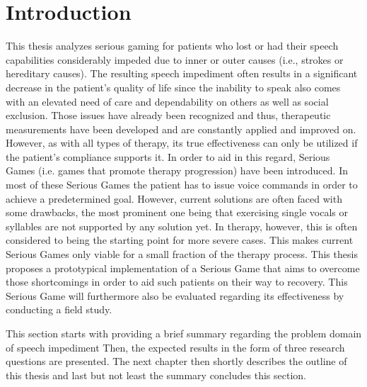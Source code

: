 \documentclass[draft,final]{vutinfth} %
\begin{document}

\setcounter{secnumdepth}{3}
\setcounter{tocdepth}{3}
\tableofcontents %

\mainmatter

\chapter{Introduction}
\label{chap:intro}
This thesis analyzes serious gaming for patients who lost or had their speech capabilities considerably impeded due to inner or outer causes (i.e., strokes or hereditary causes). The resulting speech impediment often results in a significant decrease in the patient's quality of life since the inability to speak also comes with an elevated need of care and dependability on others as well as social exclusion. Those issues have already been recognized and thus, therapeutic measurements have been developed and are constantly applied and improved on. However, as with all types of therapy, its true effectiveness can only be utilized if the patient's compliance supports it. In order to aid in this regard, Serious Games (i.e. games that promote therapy progression) have been introduced. In most of these Serious Games the patient has to issue voice commands in order to achieve a predetermined goal. However, current solutions are often faced with some drawbacks, the most prominent one being that exercising single vocals or syllables are not supported by any solution yet. In therapy, however, this is often considered to being the starting point for more severe cases. This makes current Serious Games only viable for a small fraction of the therapy process. This thesis proposes a prototypical implementation of a Serious Game that aims to overcome those shortcomings in order to aid such patients on their way to recovery. This Serious Game will furthermore also be evaluated regarding its effectiveness by conducting a field study.

This section starts with providing a brief summary regarding the problem domain of speech impediment Then, the expected results in the form of three research questions are presented. The next chapter then shortly describes the outline of this thesis and last but not least the summary concludes this section.
\end{document}
